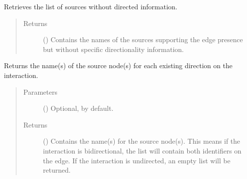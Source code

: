\documentclass[letterpaper,10pt,english]{sphinxmanual}
\begin{document}
\begin{fulllineitems}
\begin{fulllineitems}
\label{\detokenize{reference:pypath.main.Direction.sources_undirected}}
Retrieves the list of sources without directed information.
\begin{quote}\begin{description}
\item[{Returns}] \leavevmode
() \textendash{} Contains the names of the sources supporting the
edge presence but without specific directionality
information.

\end{description}\end{quote}

\end{fulllineitems}


\begin{fulllineitems}
\label{\detokenize{reference:pypath.main.Direction.src}}
Returns the name(s) of the source node(s) for each existing
direction on the interaction.
\begin{quote}\begin{description}
\item[{Parameters}] \leavevmode
{} () \textendash{} Optional,  by default.

\item[{Returns}] \leavevmode
() \textendash{} Contains the name(s) for the source node(s).
This means if the interaction is bidirectional, the list
will contain both identifiers on the edge. If the
interaction is undirected, an empty list will be returned.

\end{description}\end{quote}

\end{fulllineitems}



\end{fulllineitems}
\end{document}
